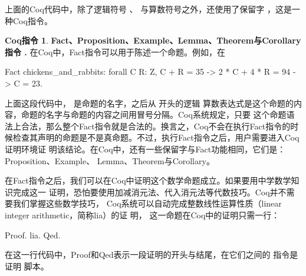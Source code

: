 \documentclass{article}[margin=1pt]
\theoremstyle{definition}
\newtheorem{CoqCmd}{Coq指令}
\begin{document}
 上面的Coq代码中，除了逻辑符号  、  与算数符号之外，还使用了保留字
      ，这是一种Coq指令。

\begin{CoqCmd}\textbf{ Fact、Proposition、Example、Lemma、Theorem与Corollary指令 . }
 在Coq中，Fact指令可以用于陈述一个命题。例如，在 
\begin{mytext2}
  Fact chickens_and_rabbits: forall C R: Z,
    C + R = 35 ->
    2 * C + 4 * R = 94 ->
    C = 23.


\end{mytext2}
\noindent
 上面这段代码中，  是命题的名字，之后从  开头的逻辑
    算数表达式是这个命题的内容，命题的名字与命题的内容之间用冒号分隔。Coq系统规定，只要
    这个命题语法上合法，那么整个Fact指令就是合法的。换言之，Coq不会在执行Fact指令的时
    候检查其声明的命题是不是真命题。不过，执行Fact指令之后，用户需要进入Coq证明环境证
    明该结论。在Coq中，还有一些保留字与Fact功能相同，它们是：Proposition、Example、
    Lemma、Theorem与Corollary。

\end{CoqCmd}
 在Fact指令之后，我们可以在Coq中证明这个数学命题成立。如果要用中学数学知识完成这一
    证明，恐怕要使用加减消元法、代入消元法等代数技巧。Coq并不需要我们掌握这些数学技巧，
    Coq系统可以自动完成整数线性运算性质（linear integer arithmetic，简称lia）的证
    明，  这一命题在Coq中的证明只需一行：

\begin{mytext3}
Proof. lia. Qed.



\end{mytext3}
\noindent
 在这一行代码中，Proof和Qed表示一段证明的开头与结尾，在它们之间的  指令是证明
    脚本。
\end{document}
